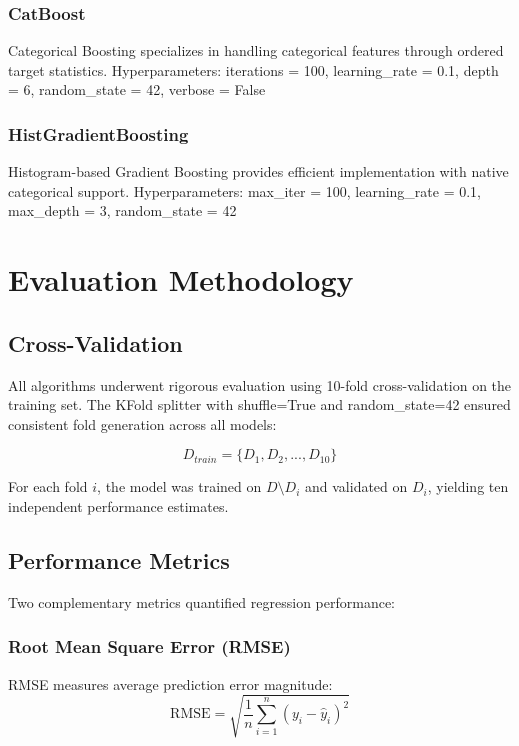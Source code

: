 \subsubsection{CatBoost}
Categorical Boosting specializes in handling categorical features through ordered target statistics. Hyperparameters: iterations = 100, learning\_rate = 0.1, depth = 6, random\_state = 42, verbose = False

\subsubsection{HistGradientBoosting}
Histogram-based Gradient Boosting provides efficient implementation with native categorical support. Hyperparameters: max\_iter = 100, learning\_rate = 0.1, max\_depth = 3, random\_state = 42

\section{Evaluation Methodology}

\subsection{Cross-Validation}

All algorithms underwent rigorous evaluation using 10-fold cross-validation on the training set. The KFold splitter with shuffle=True and random\_state=42 ensured consistent fold generation across all models:

\begin{equation}
    D_{train} = \{D_1, D_2, ..., D_{10}\}
\end{equation}

For each fold $i$, the model was trained on $D \setminus D_i$ and validated on $D_i$, yielding ten independent performance estimates.

\subsection{Performance Metrics}

Two complementary metrics quantified regression performance:

\subsubsection{Root Mean Square Error (RMSE)}
RMSE measures average prediction error magnitude:
\begin{equation}
    \text{RMSE} = \sqrt{\frac{1}{n}\sum_{i=1}^{n}(y_i - \hat{y}_i)^2}
\end{equation}

